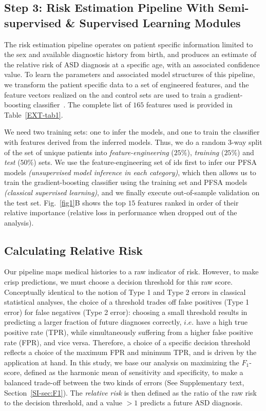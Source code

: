 \documentclass[onecolumn,10pt]{IEEEtran}
\begin{document}
\subsection*{Step 3: Risk Estimation Pipeline With Semi-supervised \& Supervised Learning Modules}
The risk estimation pipeline operates on patient specific information limited to the sex and available  diagnostic history from birth, and produces an estimate of the relative risk of ASD diagnosis at a specific age, with an associated  confidence value. To learn the parameters and associated model structures of  this pipeline, we transform the patient specific data to a set of engineered features, and the feature vectors realized on the
\treatment and control sets are  used to train a gradient-boosting classifier~\cite{gbm02}. The complete list of $165$ features used  is provided in Table~\ref{EXT-tab1}.

We need two training sets: one to infer the models, and one to  train the classifier  with features  derived  from the inferred models. Thus, we do a random 3-way split of the set of unique patients into \textit{feature-engineering} ($25\%$), \textit{training} ($25\%$) and \textit{test} ($50\%$) sets. We use the feature-engineering set of ids first to infer our PFSA models \textit{(unsupervised model inference in each category)}, which then allows us to train the gradient-boosting classifier using the training set and PFSA models \textit{(classical supervised learning)}, and we finally execute  out-of-sample validation on the test set. Fig.~\ref{fig1}B shows the top $15$ features  ranked in order of their relative importance (relative loss in performance when dropped out of the analysis). 
\subsection*{Calculating Relative Risk}
Our pipeline maps medical histories to a   raw indicator of 
risk. However, to make crisp predictions, we must choose  a decision threshold for this raw score. Conceptually identical to the notion of Type 1 and Type 2 errors in classical statistical analyses, the choice of a threshold trades off false positives (Type 1 error) for false negatives (Type 2 error): choosing a small threshold  results in predicting a larger fraction of future diagnoses correctly, $i.e.$ have a high true positive rate (TPR), while simultaneously suffering from a higher false positive rate (FPR), and vice versa. Therefore, a choice of a specific decision threshold   reflects a choice of the maximum FPR and minimum TPR, and is   driven by the application at hand. In this study, we base our analysis on maximizing the $F_1$-score, defined as the harmonic mean of sensitivity and specificity, to make a   balanced trade-off between the two kinds of errors (See Supplementary text, Section~\ref{SI-sec:F1}). The \textit{relative risk} is then defined as the ratio of the raw  risk to the  decision threshold, and a value  $>1$  predicts a future ASD diagnosis.
\end{document}
